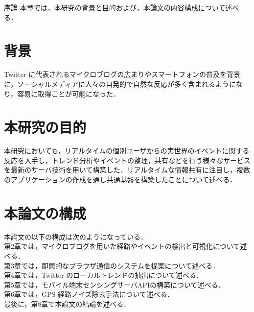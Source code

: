 \chapterhead
{序論}
{本章では，本研究の背景と目的および，本論文の内容構成について述べる．}

\section{背景}
Twitter に代表されるマイクロブログの広まりやスマートフォンの普及を背景に，ソーシャルメディアに人々の自発的で自然な反応が多く含まれるようになり，容易に取得ことが可能になった．

\section{本研究の目的}
本研究においても，リアルタイムの個別ユーザからの実世界のイベントに関する反応を入手し，トレンド分析やイベントの整理，共有などを行う様々なサービスを最新のサーバ技術を用いて構築した．リアルタイムな情報共有に注目し，複数のアプリケーションの作成を通し共通基盤を構築したことについて述べる．

\section{本論文の構成}
本論文の以下の構成は次のようになっている．\\
第2章では，マイクロブログを用いた経路やイベントの検出と可視化について述べる．\\
第3章では，即興的なブラウザ通信のシステムを提案について述べる．\\
第4章では，Twitter のローカルトレンドの抽出について述べる．\\
第5章では，モバイル端末センシングサーバAPIの構築について述べる．\\
第6章では，GPS 経路ノイズ除去手法について述べる．\\
最後に，第8章で本論文の結論を述べる．\\
